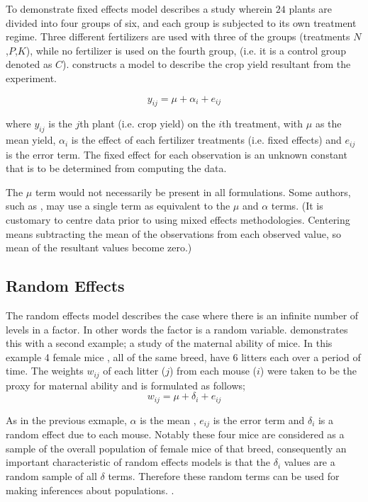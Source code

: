\documentclass[12pt, a4paper]{report}
\theoremstyle{plain}
\theoremstyle{definition}
\theoremstyle{remark}
\begin{document}
To demonstrate fixed effects model \citet{Searle} describes a
study wherein $24$ plants are divided into four groups of six, and
each group is subjected to its own treatment regime. Three
different fertilizers are used with three of the groups
(treatments $N$,$P$,$K$), while no fertilizer is used on the
fourth group, (i.e. it is a control group denoted as $C$).
\citet{Searle} constructs a model to describe the crop yield
resultant from the experiment.

\begin{equation}
y_{ij} = \mu + \alpha_{i} + e_{ij}
\end{equation}

where $y_{ij}$ is the $j$th plant (i.e. crop yield) on the $i$th
treatment, with $\mu$ as the mean yield, $\alpha_{i}$ is the
effect of each fertilizer treatments (i.e. fixed effects) and
$e_{ij}$ is the error term. The fixed effect for each observation
is an unknown constant that is to be determined from computing the
data.

The $\mu$ term would not
necessarily be present in all formulations. Some authors, such as
\citet{Demi}, may use a single term as equivalent to the $\mu$ and
$\alpha$ terms. (It is customary to centre data prior to using
mixed effects methodologies. Centering means subtracting the mean
of the observations from each observed value, so mean of the
resultant values become zero.)

\subsection{Random Effects}
The random effects model describes the case where there is an
infinite number of levels in a factor. In other words the factor
is a random variable. \citet{Searle} demonstrates this with a
second example; a study of the maternal ability of mice. In this
example 4 female mice , all of the same breed, have 6 litters each
over a period of time. The weights $w_{ij}$ of each litter ($j$)
from each mouse ($i$) were taken to be the proxy for maternal
ability and is formulated as follows;
\begin{equation}
w_{ij} = \mu + \delta_{i} + e_{ij}
\end{equation}

As in the previous exmaple, $\alpha$ is the mean , $e_{ij}$ is the
error term and $\delta_{i}$ is a random effect due to each mouse.
Notably these four mice are considered as a sample of the overall
population of female mice of that breed, consequently an important
characteristic of random effects models is that the $\delta_{i}$
values are a random sample of all $\delta$ terms. Therefore these
random terms can be used for making inferences about populations.
\citep{McCullSearle}.
\end{document}
